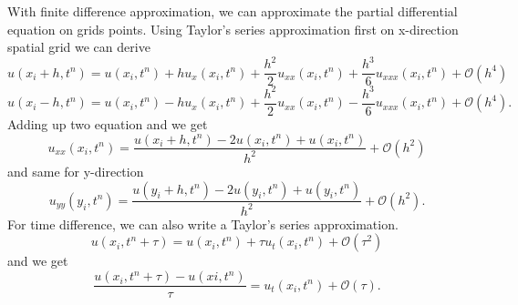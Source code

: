 \documentclass[10pt,a4paper]{report}
\begin{document}
With finite difference approximation, we can approximate the partial differential equation on grids points. Using Taylor's series approximation first on x-direction spatial grid we can derive
\[u(x_i+h,t^n)=u(x_i,t^n)+hu_x(x_i,t^n)+{\frac{h^2}{2}}u_{xx}(x_i,t^n)+{\frac{h^3}{6}}u_{xxx}(x_i,t^n)+\mathcal{O}(h^4)\]
\[u(x_i-h,t^n)=u(x_i,t^n)-hu_x(x_i,t^n)+{\frac{h^2}{2}}u_{xx}(x_i,t^n)-{\frac{h^3}{6}}u_{xxx}(x_i,t^n)+\mathcal{O}(h^4) .\]
Adding up two equation and we get
\[u_{xx}(x_i,t^n)={\frac{u(x_i+h,t^n)-2u(x_i,t^n)+u(x_i,t^n)}{h^2}}+\mathcal{O}(h^2)\]
and same for y-direction
\[u_{yy}(y_i,t^n)={\frac{u(y_i+h,t^n)-2u(y_i,t^n)+u(y_i,t^n)}{h^2}}+\mathcal{O}(h^2).\]
For time difference, we can also write a Taylor's series approximation.
\[u(x_i,t^n+\tau)=u(x_i,t^n)+\tau u_t(x_i,t^n)+\mathcal{O}(\tau^2) \]and we get \[{\frac{u(x_i,t^n+\tau)-u(xi,t^n)}{\tau}}=u_t(x_i,t^n)+\mathcal{O}(\tau).\] 



\end{document}
